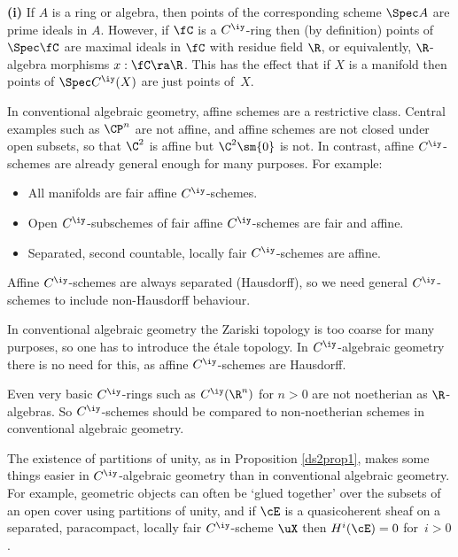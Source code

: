 \documentclass{article}
\begin{document}
\begin{rem}{\bf(i)} If $A$ is a ring or algebra, then points of the
corresponding scheme $\Spec A$ are prime ideals in $A$. However, if
$\fC$ is a $C^\iy$-ring then (by definition) points of $\Spec\fC$
are maximal ideals in $\fC$ with residue field $\R$, or
equivalently, $\R$-algebra morphisms $x:\fC\ra\R$. This has the
effect that if $X$ is a manifold then points of $\Spec C^\iy(X)$ are
just points of~$X$.
\smallskip

 In conventional algebraic geometry, affine
schemes are a restrictive class. Central examples such as $\CP^n$
are not affine, and affine schemes are not closed under open
subsets, so that $\C^2$ is affine but $\C^2\sm\{0\}$ is not. In
contrast, affine $C^\iy$-schemes are already general enough for many
purposes. For example:
\begin{itemize}
\setlength{\itemsep}{0pt}
\setlength{\parsep}{0pt}
\item All manifolds are fair affine $C^\iy$-schemes.
\item Open $C^\iy$-subschemes of fair affine $C^\iy$-schemes are
fair and affine.
\item Separated, second countable, locally fair $C^\iy$-schemes
are affine.
\end{itemize}
Affine $C^\iy$-schemes are always separated (Hausdorff), so we need
general $C^\iy$-schemes to include non-Hausdorff behaviour.
\smallskip

 In conventional algebraic geometry the Zariski
topology is too coarse for many purposes, so one
has to introduce the \'etale topology. In $C^\iy$-algebraic geometry there is no need for this,
as affine $C^\iy$-schemes are Hausdorff.
\smallskip

 Even very basic $C^\iy$-rings such as
$C^\iy(\R^n)$ for $n>0$ are not noetherian as $\R$-algebras. So
$C^\iy$-schemes should be compared to non-noetherian schemes in
conventional algebraic geometry.
\smallskip

 The existence of partitions of unity, as in Proposition \ref{ds2prop1}, makes some things easier
in $C^\iy$-algebraic geometry than in conventional algebraic
geometry. For example, geometric objects can often be `glued
together' over the subsets of an open cover using partitions of
unity, and if $\cE$ is a quasicoherent sheaf on a separated,
paracompact, locally fair $C^\iy$-scheme $\uX$ then $H^i(\cE)=0$
for~$i>0$.
\label{ds2rem1}
\end{rem}
\end{document}
